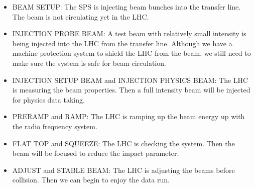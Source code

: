 \begin{itemize}
\item BEAM SETUP: The SPS is injecting beam bunches into the transfer line. The beam is not circulating yet in the LHC.
\item INJECTION PROBE BEAM: A test beam with relatively small intensity is being injected into the LHC from the transfer line. Although we have a machine protection system to shield the LHC from the beam, we still need to make sure the system is safe for beam circulation.
\item INJECTION SETUP BEAM and INJECTION PHYSICS BEAM: The LHC is measuring the beam properties. Then a full intensity beam will be injected for physics data taking.
\item PRERAMP and RAMP: The LHC is ramping up the beam energy up with the radio frequency system.
\item FLAT TOP and SQUEEZE: The LHC is checking the system. Then the beam will be focused to reduce the impact parameter.
\item ADJUST and STABLE BEAM: The LHC is adjusting the beams before collision. Then we can begin to enjoy the data run.
\end{itemize}

